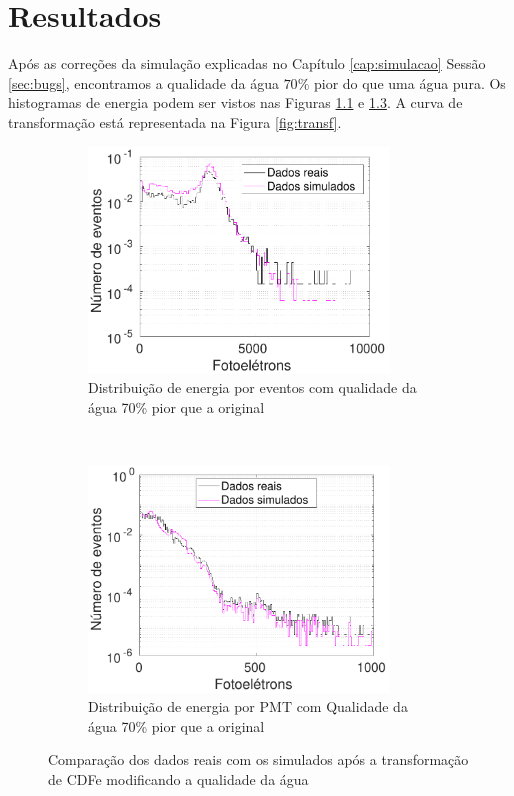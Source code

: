 \chapter{Resultados} \label{cap:resultados}
\vspace{-2cm}

Após as correções da simulação explicadas no Capítulo \ref{cap:simulacao} Sessão \ref{sec:bugs}, encontramos a qualidade da água $70\%$ pior do que uma água pura. Os histogramas de energia podem ser vistos nas Figuras \ref{fig:a5} e \ref{fig:b4}. A curva de transformação está representada na Figura \ref{fig:transf}.


\begin{figure}[ht]
	\centering
	\begin{subfigure}{0.5\textwidth}
		\centering
		\includegraphics[width=8cm]{textuais/simulacao/figuras/hist_evt4.pdf}
		\caption{Distribuição de energia por eventos com qualidade da água 70\% pior que a original}
		\label{fig:a5}
	\end{subfigure}%
	~ 
	\begin{subfigure}{0.5\textwidth}
		\centering		
		\includegraphics[width=8cm]{textuais/simulacao/figuras/hist_pmt4.pdf}
		\caption{Distribuição de energia por PMT com Qualidade da água 70\% pior que a original}
		\label{fig:b4}
	\end{subfigure}
	\caption{Comparação dos dados reais com os simulados após a transformação de CDFe modificando a qualidade da água}
\end{figure}



